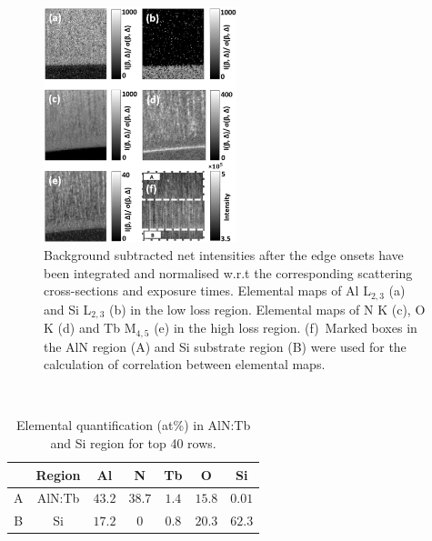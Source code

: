 \documentclass[%
aip,
rsi,%
 amsmath,amssymb,%
 reprint,%
]{revtex4-1}
\begin{document}
\begin{figure}%
    \includegraphics[width=0.5\textwidth]{combined_maps}
    \caption{Background subtracted net intensities after the edge onsets have been integrated and normalised w.r.t the corresponding scattering cross-sections and exposure times. Elemental maps of Al L$_{2,3}$ (a) and Si L$_{2,3}$ (b) in the low loss region. Elemental maps of N K (c), O K (d) and Tb M$_{4,5}$ (e) in the high loss region. (f)~Marked boxes in the AlN region (A) and Si substrate region (B) were used for the calculation of correlation between elemental maps.}
    \label{fig:combined_maps}
\end{figure}
\\
\begin{table}%
	\caption{Elemental quantification (at\%) in AlN:Tb and Si region for top 40 rows.}
    \label{tab:atper}
    \begin{ruledtabular}
    	\begin{tabular}{ccccccc}
        	&Region&Al&N&Tb&O&Si								\\ \hline
            A&AlN:Tb&$43.2$&$38.7$&$1.4$&$15.8$&$0.01$   \\
            B&Si &$17.2$&$0$&$0.8$&$20.3$&$62.3$
    	\end{tabular}
    \end{ruledtabular}
\end{table}
\end{document}
